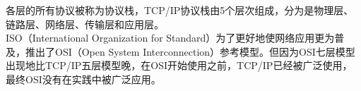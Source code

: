 各层的所有协议被称为协议栈，TCP/IP协议栈由5个层次组成，分为是物理层、链路层、网络层、传输层和应用层。\\

ISO（International Organization for Standard）为了更好地使网络应用更为普及，推出了OSI（Open System Interconnection）参考模型。但因为OSI七层模型出现地比TCP/IP五层模型晚，在OSI开始使用之前，TCP/IP已经被广泛使用，最终OSI没有在实践中被广泛应用。\\

\begin{table}[H]
    \centering
    \caption{OSI七层模型}
\end{table}

\vspace{0.5cm}

